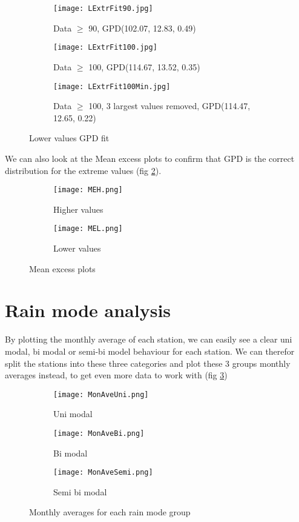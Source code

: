 \documentclass{article}
\begin{document}
	\begin{figure}[H]
		\centering
		\begin{subfigure}{0.5\textwidth}
			\centering
			\texttt{[image: LExtrFit90.jpg]}
			\caption{Data $\geq$ 90, GPD(102.07, 12.83, 0.49)}
		\end{subfigure}%
		\begin{subfigure}{0.5\textwidth}
			\centering
			\texttt{[image: LExtrFit100.jpg]}
			\caption{Data $\geq$ 100, GPD(114.67, 13.52, 0.35)}
		\end{subfigure}
		\begin{subfigure}{0.5\textwidth}
			\centering
			\texttt{[image: LExtrFit100Min.jpg]}
			\caption{Data $\geq$ 100, 3 largest values removed, GPD(114.47, 12.65, 0.22)}
		\end{subfigure}
		\caption{Lower values GPD fit}
		\label{GPDL}
	\end{figure}
	
	We can also look at the Mean excess plots to confirm that GPD is the correct distribution for the extreme values (fig \ref{MEplots}).
	\begin{figure}[H]
		\centering
		\begin{subfigure}{0.5\textwidth}
			\centering
			\texttt{[image: MEH.png]}
			\caption{Higher values}
		\end{subfigure}%
		\begin{subfigure}{0.5\textwidth}
			\centering
			\texttt{[image: MEL.png]}
			\caption{Lower values}
		\end{subfigure}
		\caption{Mean excess plots}
		\label{MEplots}
	\end{figure}
	
	\section{Rain mode analysis}
	By plotting the monthly average of each station, we can easily see a clear uni modal, bi modal or semi-bi model behaviour for each station. We can therefor split the stations into these three categories and plot these 3 groups monthly averages instead, to get even more data to work with (fig \ref{MonAvegroups})
		\begin{figure}[H]
		\centering
		\begin{subfigure}{0.5\textwidth}
			\centering
			\texttt{[image: MonAveUni.png]}
			\caption{Uni modal}
		\end{subfigure}%
		\begin{subfigure}{0.5\textwidth}
			\centering
			\texttt{[image: MonAveBi.png]}
			\caption{Bi modal}
		\end{subfigure}
		\begin{subfigure}{0.5\textwidth}
			\centering
			\texttt{[image: MonAveSemi.png]}
			\caption{Semi bi modal}
		\end{subfigure}
		\caption{Monthly averages for each rain mode group}
		\label{MonAvegroups}
	\end{figure}
	
\end{document}

